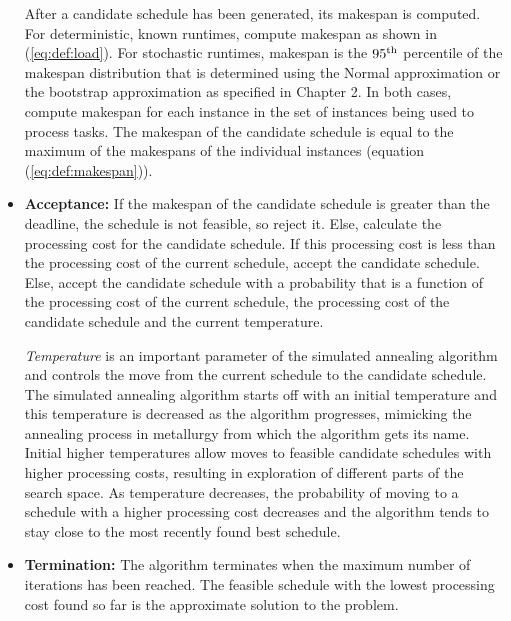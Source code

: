 \documentclass[12pt]{report}
\begin{document}
\begin{itemize}
		After a candidate schedule has been generated, its makespan is computed.
		For deterministic, known runtimes, compute makespan as shown in (\ref{eq:def:load}).
		For stochastic runtimes, makespan is the $95\textsuperscript{th}$ percentile of the makespan distribution that is determined using the Normal approximation or the bootstrap approximation as specified in Chapter 2.  
		In both cases, compute makespan for each instance in the set of instances being used to process tasks. 
		The makespan of the candidate schedule is equal to the maximum of the makespans of the individual instances (equation (\ref{eq:def:makespan})).
	\item \textbf{Acceptance:} If the makespan of the candidate schedule is greater than the deadline, the schedule is not feasible, so reject it.
		Else, calculate the processing cost for the candidate schedule.
		If this processing cost is less than the processing cost of the current schedule, accept the candidate schedule.
		Else, accept the candidate schedule with a probability that is a function of the processing cost of the current schedule, the processing cost of the candidate schedule and the current temperature.
		
		\textit{Temperature} is an important parameter of the simulated annealing algorithm and controls the move from the current schedule to the candidate schedule. 
		The simulated annealing algorithm starts off with an initial temperature and this temperature is decreased as the algorithm progresses, mimicking the annealing process in metallurgy from which the algorithm gets its name.
		Initial higher temperatures allow moves to feasible candidate schedules with higher processing costs, resulting in exploration of different parts of the search space.
		As temperature decreases, the probability of moving to a schedule with a higher processing cost decreases and the algorithm tends to stay close to the most recently found best schedule.
		
	\item \textbf{Termination:} The algorithm terminates when the maximum number of iterations has been reached. The feasible schedule with the lowest processing cost found so far is the approximate solution to the problem.
\end{itemize}
\end{document}
